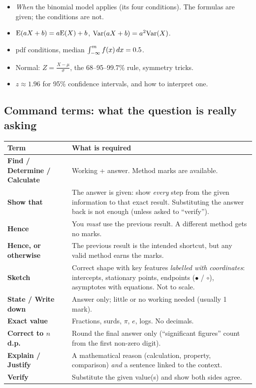 \begin{cols}
\begin{warn}
{\begin{itemize}
  \item \emph{When} the binomial model applies (its four conditions). The formulas are given; the conditions are not.
  \item $\mathrm{E}(aX+b)=a\mathrm{E}(X)+b$, $\mathrm{Var}(aX+b)=a^2\mathrm{Var}(X)$.
  \item pdf conditions, median $\int_{-\infty}^{m}f(x)\,dx=0.5$.
  \item Normal: $Z=\frac{X-\mu}{\sigma}$, the 68--95--99.7\% rule, symmetry tricks.
  \item $z\approx1.96$ for 95\% confidence intervals, and how to interpret one.
\end{itemize}}
\end{warn}
\end{cols}

\subsection{Command terms: what the question is really asking}

\begin{center}
\small
\begin{tabularx}{\linewidth}{@{}>{\bfseries}p{3.0cm}L@{}}
\toprule
Term & What is required \\
\midrule
Find / Determine / Calculate & Working + answer. Method marks are available. \\
Show that & The answer is given: show \emph{every} step from the given information to that exact result. Substituting the answer back is not enough (unless asked to ``verify''). \\
Hence & You \emph{must} use the previous result. A different method gets no marks. \\
Hence, or otherwise & The previous result is the intended shortcut, but any valid method earns the marks. \\
Sketch & Correct shape with key features \emph{labelled with coordinates}: intercepts, stationary points, endpoints ($\bullet$ / $\circ$), asymptotes with equations. Not to scale. \\
State / Write down & Answer only; little or no working needed (usually 1 mark). \\
Exact value & Fractions, surds, $\pi$, $e$, logs. No decimals. \\
Correct to $n$ d.p. & Round the final answer only (``significant figures'' count from the first non-zero digit). \\
Explain / Justify & A mathematical reason (calculation, property, comparison) \emph{and} a sentence linked to the context. \\
Verify & Substitute the given value(s) and show both sides agree. \\
\bottomrule
\end{tabularx}
\end{center}

